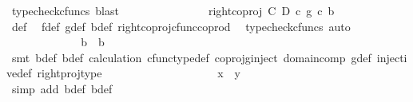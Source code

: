 \begin{isabellebody}
\ {\isacharparenleft}{\kern0pt}typecheck{\isacharunderscore}{\kern0pt}cfuncs{\isacharcomma}{\kern0pt}\ blast{\isacharparenright}{\kern0pt}\isanewline
\ \ \ \ \ \ \ \ \ \ \isamarkupfalse%
\ \isamarkupfalse%
\ {\isachardoublequoteopen}{\isachardot}{\kern0pt}{\isachardot}{\kern0pt}{\isachardot}{\kern0pt}\ {\isacharequal}{\kern0pt}\ {\isacharparenleft}{\kern0pt}right{\isacharunderscore}{\kern0pt}coproj\ C\ D\ {\isasymcirc}\isactrlsub c\ g{\isacharparenright}{\kern0pt}\ {\isasymcirc}\isactrlsub c\ b{\isacharprime}{\kern0pt}{\isachardoublequoteclose}\isanewline
\ \ \ \ \ \ \ \ \ \ \ \ \isamarkupfalse%
\ {\isasymphi}{\isacharunderscore}{\kern0pt}def\ \isamarkupfalse%
\ f{\isacharunderscore}{\kern0pt}def\ g{\isacharunderscore}{\kern0pt}def\ b{\isacharprime}{\kern0pt}{\isacharunderscore}{\kern0pt}def\ right{\isacharunderscore}{\kern0pt}coproj{\isacharunderscore}{\kern0pt}cfunc{\isacharunderscore}{\kern0pt}coprod\ \isamarkupfalse%
\ {\isacharparenleft}{\kern0pt}typecheck{\isacharunderscore}{\kern0pt}cfuncs{\isacharcomma}{\kern0pt}\ auto{\isacharparenright}{\kern0pt}\isanewline
\ \ \ \ \ \ \ \ \ \ \isamarkupfalse%
\ \isamarkupfalse%
\ {\isachardoublequoteopen}b\ {\isacharequal}{\kern0pt}\ b{\isacharprime}{\kern0pt}{\isachardoublequoteclose}\isanewline
\ \ \ \ \ \ \ \ \ \ \ \ \isamarkupfalse%
\ {\isacharparenleft}{\kern0pt}smt\ b{\isacharprime}{\kern0pt}{\isacharunderscore}{\kern0pt}def\ b{\isacharunderscore}{\kern0pt}def\ calculation\ cfunc{\isacharunderscore}{\kern0pt}type{\isacharunderscore}{\kern0pt}def\ coproj{\isacharunderscore}{\kern0pt}g{\isacharunderscore}{\kern0pt}inject\ domain{\isacharunderscore}{\kern0pt}comp\ g{\isacharunderscore}{\kern0pt}def\ injective{\isacharunderscore}{\kern0pt}def\ right{\isacharunderscore}{\kern0pt}proj{\isacharunderscore}{\kern0pt}type{\isacharparenright}{\kern0pt}\isanewline
\ \ \ \ \ \ \ \ \isamarkupfalse%
\isanewline
\ \ \ \ \ \ \ \ \isamarkupfalse%
\ \isamarkupfalse%
\ {\isachardoublequoteopen}x\ {\isacharequal}{\kern0pt}\ y{\isachardoublequoteclose}\isanewline
\ \ \ \ \ \ \ \ \ \ \isamarkupfalse%
\ {\isacharparenleft}{\kern0pt}simp\ add{\isacharcolon}{\kern0pt}\ b{\isacharprime}{\kern0pt}{\isacharunderscore}{\kern0pt}def{\isacharparenleft}{\kern0pt}{}{\isacharparenright}{\kern0pt}\ b{\isacharunderscore}{\kern0pt}def{\isacharparenright}{\kern0pt}\isanewline
\ \ \ \ \ \ \isamarkupfalse%
\isanewline

\end{isabellebody}
